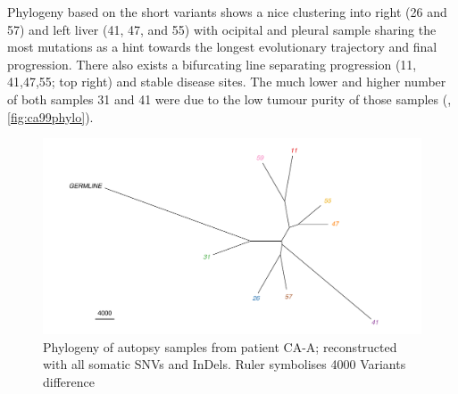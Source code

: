 Phylogeny based on the short variants shows a nice clustering into right (26 and 57) and left liver (41, 47, and 55) with ocipital and pleural sample sharing the most mutations as a hint towards the longest evolutionary trajectory and final progression. There also exists a bifurcating line separating progression (11, 41,47,55; top right) and stable disease sites. The much lower and higher number of both samples 31 and 41 were due to the low tumour purity of those samples (, \autoref{fig:ca99phylo}).

\begin{figure}[ht]
	\centering
	\includegraphics[width=.99\linewidth]{Figures/CASCADE/CA99/CA99phylo.pdf}
	\caption[Phylogeny of autopsy samples from patient CA-A]{Phylogeny of autopsy samples from patient CA-A; reconstructed with all somatic SNVs and InDels. Ruler symbolises 4000 Variants difference} \label{fig:ca99phylo}
\end{figure}

